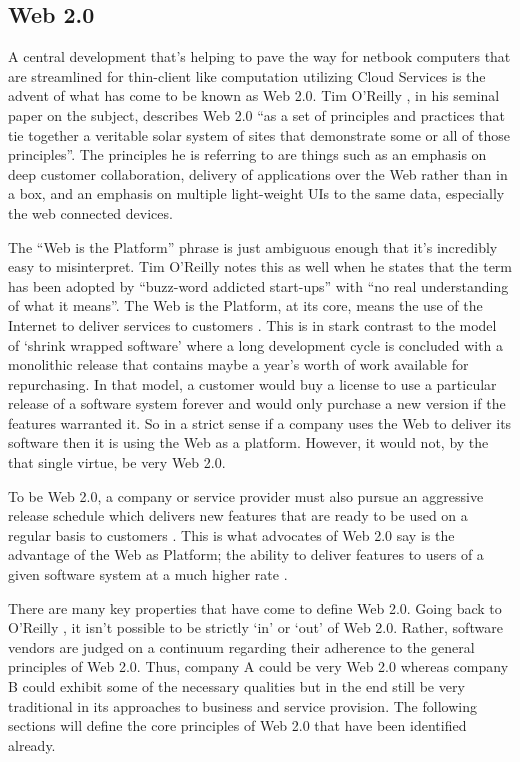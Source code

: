 \subsection{Web 2.0}

A central development that's helping to pave the way for netbook computers that
are streamlined for thin-client like computation utilizing Cloud Services is the
advent of what has come to be known as Web 2.0.  Tim O'Reilly
\citeyearpar{oreilly2007}, in his seminal paper on the subject, describes Web
2.0 ``as a set of principles and practices that tie together a veritable solar
system of sites that demonstrate some or all of those principles''. The
principles he is referring to are things such as an emphasis on deep customer
collaboration, delivery of applications over the Web rather than in a box, and
an emphasis on multiple light-weight UIs to the same data, especially the web
connected devices.

The ``Web is the Platform'' phrase is just ambiguous enough that it's incredibly
easy to misinterpret.  Tim O'Reilly \citeyearpar{oreilly2007} notes this as well when
he states that the term has been adopted by ``buzz-word addicted start-ups''
with ``no real understanding of what it means''.  The Web is the Platform, at
its core, means the use of the Internet to deliver services to customers
\citep{miller2005}.  This is in stark contrast to the model of `shrink wrapped
software' where a long development cycle is concluded with a monolithic release
that contains maybe a year's worth of work available for repurchasing.  In that
model, a customer would buy a license to use a particular release of a software
system forever and would only purchase a new version if the features warranted
it.  So in a strict sense if a company uses the Web to deliver its software then
it is using the Web as a platform.  However, it would not, by the that single
virtue, be very Web 2.0.

To be Web 2.0, a company or service provider must also pursue an aggressive
release schedule which delivers new features that are ready to be used on a
regular basis to customers \citep{miller2005}.  This is what advocates of Web
2.0 say is the advantage of the Web as Platform; the ability to deliver features
to users of a given software system at a much higher rate \citep{oreilly2007}.

There are many key properties that have come to define Web 2.0.  Going back to
O'Reilly \citeyearpar{oreilly2007}, it isn't possible to be strictly `in' or
`out' of Web 2.0.  Rather, software vendors are judged on a continuum regarding
their adherence to the general principles of Web 2.0.  Thus, company A could be
very Web 2.0 whereas company B could exhibit some of the necessary qualities but
in the end still be very traditional in its approaches to business and service
provision.  The following sections will define the core principles of Web 2.0
that have been identified already.

